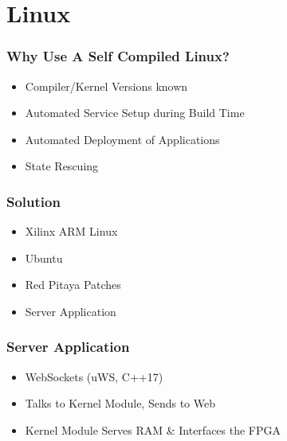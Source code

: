 \section{Linux}

\begin{frame}
    \frametitle{Why Use A Self Compiled Linux?}

    \begin{itemize}
        \item
            Compiler/Kernel Versions known
        \item
            Automated Service Setup during Build Time
        \item
            Automated Deployment of Applications
        \item
            State Rescuing
    \end{itemize}
\end{frame}

\begin{frame}
    \frametitle{Solution}

    \begin{itemize}
        \item
            Xilinx ARM Linux
        \item
            Ubuntu
        \item
            Red Pitaya Patches
        \item
            Server Application
    \end{itemize}
\end{frame}

\begin{frame}
    \frametitle{Server Application}

    \begin{itemize}
        \item
            WebSockets (uWS, C++17)
        \item
            Talks to Kernel Module, Sends to Web
        \item
            Kernel Module Serves RAM \& Interfaces the FPGA
    \end{itemize}
\end{frame}